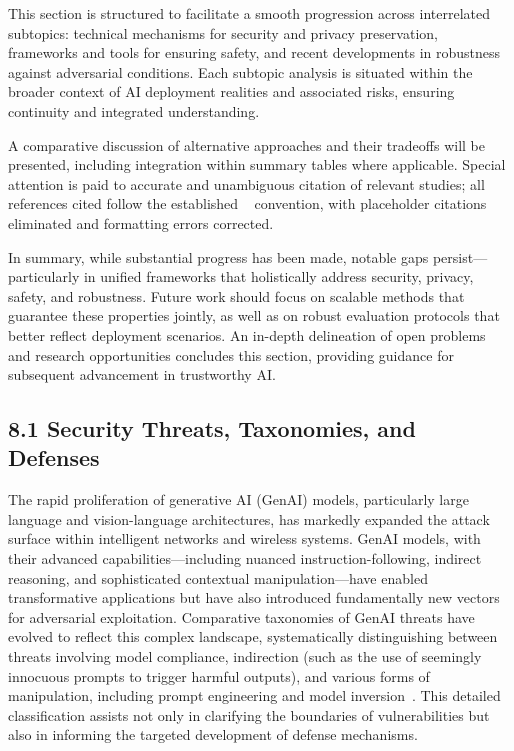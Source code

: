 \documentclass[sigconf]{acmart}
\begin{document}
This section is structured to facilitate a smooth progression across interrelated subtopics: technical mechanisms for security and privacy preservation, frameworks and tools for ensuring safety, and recent developments in robustness against adversarial conditions. Each subtopic analysis is situated within the broader context of AI deployment realities and associated risks, ensuring continuity and integrated understanding.

A comparative discussion of alternative approaches and their tradeoffs will be presented, including integration within summary tables where applicable. Special attention is paid to accurate and unambiguous citation of relevant studies; all references cited follow the established ~\cite{} convention, with placeholder citations eliminated and formatting errors corrected.

In summary, while substantial progress has been made, notable gaps persist—particularly in unified frameworks that holistically address security, privacy, safety, and robustness. Future work should focus on scalable methods that guarantee these properties jointly, as well as on robust evaluation protocols that better reflect deployment scenarios. An in-depth delineation of open problems and research opportunities concludes this section, providing guidance for subsequent advancement in trustworthy AI.

\subsection{8.1 Security Threats, Taxonomies, and Defenses}

The rapid proliferation of generative AI (GenAI) models, particularly large language and vision-language architectures, has markedly expanded the attack surface within intelligent networks and wireless systems. GenAI models, with their advanced capabilities—including nuanced instruction-following, indirect reasoning, and sophisticated contextual manipulation—have enabled transformative applications but have also introduced fundamentally new vectors for adversarial exploitation. Comparative taxonomies of GenAI threats have evolved to reflect this complex landscape, systematically distinguishing between threats involving model compliance, indirection (such as the use of seemingly innocuous prompts to trigger harmful outputs), and various forms of manipulation, including prompt engineering and model inversion~\cite{ref3}. This detailed classification assists not only in clarifying the boundaries of vulnerabilities but also in informing the targeted development of defense mechanisms.
\end{document}

